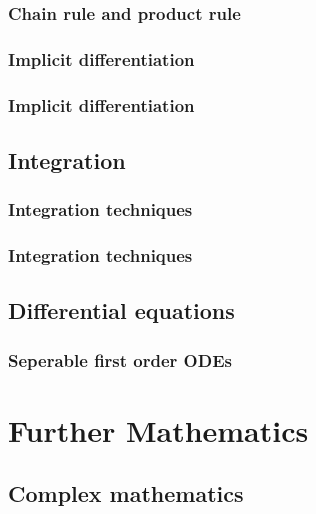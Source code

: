 \documentclass{article}
\begin{document}
\subsubsection{Chain rule and product rule}


\subsubsection{Implicit differentiation}


\subsubsection{Implicit differentiation}



\subsection{Integration}

\subsubsection{Integration techniques}


\subsubsection{Integration techniques}



\subsection{Differential equations}

\subsubsection{Seperable first order ODEs}



\section{Further Mathematics}


\subsection{Complex mathematics}
\end{document}

